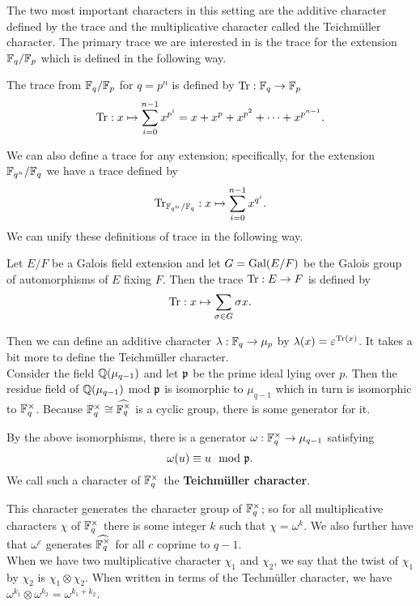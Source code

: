 The two most important characters in this setting are the additive character defined by the trace and the multiplicative character called the Teichm\"uller character. 
The primary trace we are interested in is the trace for the extension $\mathbb{F}_q / \mathbb{F}_p$ which is defined in the following way.
\begin{defn}
The trace from $\mathbb{F}_q / \mathbb{F}_p$ for $q = p^n$ is defined by $\textrm{Tr} : \mathbb{F}_q \to \mathbb{F}_p$
 \[ \textrm{Tr} : x \mapsto \sum_{i=0}^{n-1} x^{p^i} = x + x^p + x^{p^2} + \cdots + x^{p^{n-1}}.\]
\end{defn}
We can also define a trace for any extension; specifically, for the extension $\mathbb{F}_{q^n}/\mathbb{F}_q$ we have a trace defined by \[\textrm{Tr}_{\mathbb{F}_{q^n}/\mathbb{F}_q} : x \mapsto \sum_{i=0}^{n-1} x^{q^i}.\] 
We can unify these definitions of trace in the following way.
\begin{defn}
Let $E/F$ be a Galois field extension and let $G = \textrm{Gal}(E/F)$ be the Galois group of automorphisms of $E$ fixing $F$. 
Then the trace $\textrm{Tr} : E \to F$ is defined by \[\textrm{Tr} : x \mapsto \sum_{\sigma \in G} \sigma x.\]
\end{defn}

\noindent Then we can define an additive character $\lambda : \mathbb{F}_q \to \mu_p$ by $\lambda(x) = \varepsilon^{\textrm{Tr}(x)}$.
It takes a bit more to define the Teichm\"uller character.\\

Consider the field $\mathbb{Q}(\mu_{q-1})$ and let $\mathfrak{p}$ be the prime ideal lying over $p$.
Then the residue field of $\mathbb{Q}(\mu_{q-1})$ mod $\mathfrak{p}$ is isomorphic to $\mu_{q-1}$ which in turn is isomorphic to $\mathbb{F}_q^\times$.
Because $\mathbb{F}_q^\times \cong \widehat{\mathbb{F}_q^\times}$ is a cyclic group, there is some generator for it.
\begin{prop}\label{def:Teichmuller-char}
  By the above isomorphisms, there is a generator $\omega : \mathbb{F}_q^\times \to \mu_{q-1}$ satisfying \[\omega (u) \equiv  u \mod {\mathfrak{p}}.\]
  We call such a character of $\mathbb{F}_q^\times$ the \textbf{Teichm\"uller character}.
\end{prop}
\noindent This character generates the character group of $\mathbb{F}_q^\times$; so for all multiplicative characters $\chi$ of $\mathbb{F}_q^\times$ there is some integer $k$ such that $\chi = \omega^k$.
We also further have that $\omega^c$ generates $\widehat{\mathbb{F}_q^\times}$ for all $c$ coprime to $q-1$.\\

When we have two multiplicative character $\chi_1$ and $\chi_2$, we say that the twist of $\chi_1$ by $\chi_2$ is $\chi_1 \otimes \chi_2$.
When written in terms of the Techm\"uller character, we have $\omega^{k_1} \otimes \omega^{k_2} = \omega^{k_1+k_2}$.

